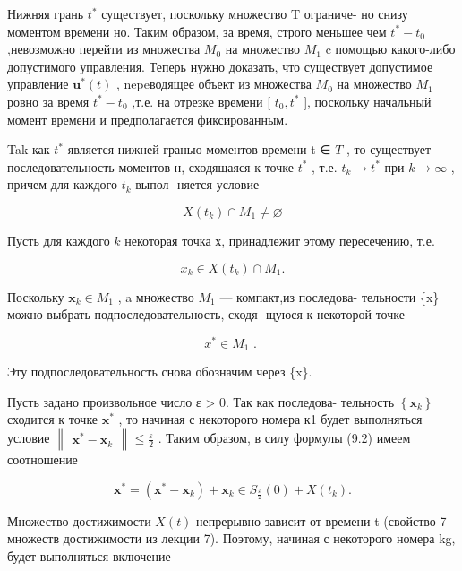 \documentclass[8pt]{extarticle}
\begin{document}
Нижняя грань \({t}^{ * }\) существует, поскольку множество T ограниче- но снизу моментом времени но. Таким образом, за время, строго меньшее чем \({t}^{ * } - {t}_{0}\) ,невозможно перейти из множества \({M}_{0}\) на множество \({M}_{1}\) c помощью какого-либо допустимого управления. Теперь нужно доказать, что существует допустимое управление \({\mathbf{u}}^{ * }\left( t\right)\) , nepeводящее объект из множества \({M}_{0}\) на множество \({M}_{1}\) ровно за время \({t}^{ * } - {t}_{0}\) ,т.е. на отрезке времени [ \({t}_{0},{t}^{ * }\) ], поскольку начальный момент времени и предполагается фиксированным.

Tak как \({t}^{ * }\) является нижней гранью моментов времени t ∈ \(T\) , то существует последовательность моментов н, сходящаяся к точке \({t}^{ * }\) , т.е. \({t}_{k} \rightarrow  {t}^{ * }\) при \(k \rightarrow  \infty\) , причем для каждого \({t}_{k}\) выпол- няется условие

\[
X\left( {t}_{k}\right)  \cap  {M}_{1} \neq  \varnothing
\]

Пусть для каждого \(k\) некоторая точка х, принадлежит этому пересечению, т.е.

\[
{x}_{k} \in  X\left( {t}_{k}\right)  \cap  {M}_{1}. \tag{9.2}
\]

Поскольку \({\mathbf{x}}_{k} \in  {M}_{1}\) , a множество \({M}_{1}\) — компакт,из последова- тельности \{x\} можно выбрать подпоследовательность, сходя- щуюся к некоторой точке

\[
{x}^{ * } \in  {M}_{1}\text{ . } \tag{9.3}
\]

Эту подпоследовательность снова обозначим через \{x\}.

Пусть задано произвольное число ε > 0. Так как последова- тельность \(\left\{  {\mathbf{x}}_{k}\right\}\) сходится к точке \({\mathbf{x}}^{ * }\) , то начиная с некоторого номера к1 будет выполняться условие \(\left\lVert \begin{array}{c} {{\mathbf{x}}^{ * } - {\mathbf{x}}_{k}} \end{array} \right\rVert \leq  \frac{\varepsilon }{2}\) . Таким образом, в силу формулы (9.2) имеем соотношение

\[
{\mathbf{x}}^{ * } = \left( {{\mathbf{x}}^{ * } - {\mathbf{x}}_{k}}\right)  + {\mathbf{x}}_{k} \in  {S}_{\frac{\varepsilon }{2}}\left( 0\right)  + X\left( {t}_{k}\right) . \tag{9.4}
\]

Множество достижимости \(X\left( t\right)\) непрерывно зависит от времени t (свойство 7 множеств достижимости из лекции 7). Поэтому, начиная с некоторого номера kg, будет выполняться включение
\end{document}
